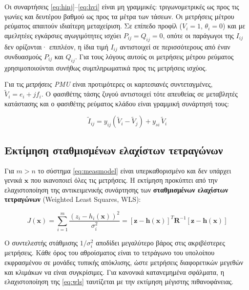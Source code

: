 Οι συναρτήσεις \eqref{eq:hinj}--\eqref{eq:hvi} είναι μη γραμμικές: τριγωνομετρικές ως προς τις
γωνίες και δευτέρου βαθμού ως προς τα μέτρα των τάσεων. Οι μετρήσεις μέτρου ρεύματος απαιτούν
ιδιαίτερη μεταχείριση. Σε επίπεδο προφίλ ($V_i = 1$, $\theta_i = 0$) και με αμελητέες
εγκάρσιες αγωγιμότητες ισχύει $P_{ij} = Q_{ij} = 0$, οπότε οι παράγωγοι της $I_{ij}$ δεν
ορίζονται· επιπλέον, η ίδια τιμή $I_{ij}$ αντιστοιχεί σε περισσότερους από έναν συνδυασμούς
$P_{ij}$ και $Q_{ij}$. Για τους λόγους αυτούς οι μετρήσεις μέτρου ρεύματος χρησιμοποιούνται
συνήθως συμπληρωματικά προς τις μετρήσεις ισχύος.

Για τις \emph{μετρήσεις PMU} είναι προτιμότερες οι καρτεσιανές συντεταγμένες,
$\tilde{V}_i = e_i + j f_i$. Ο φασιθέτης τάσης ζυγού αντιστοιχεί τότε απευθείας σε μεταβλητές
κατάστασης και ο φασιθέτης ρεύματος κλάδου είναι γραμμική συνάρτησή τους:

\begin{equation}
\tilde{I}_{ij} = y_{ij}\left(\tilde{V}_i - \tilde{V}_j\right) + y_{si}\,\tilde{V}_i
\label{eq:hpmu}
\end{equation}

\subsection{Εκτίμηση σταθμισμένων ελαχίστων τετραγώνων}
\label{sec:wls}

Για $m > n$ το σύστημα \eqref{eq:measmodel} είναι υπερκαθορισμένο και δεν υπάρχει γενικά
$\mathbf{x}$ που ικανοποιεί όλες τις μετρήσεις. Η εκτίμηση προκύπτει από την ελαχιστοποίηση της
αντικειμενικής συνάρτησης των \textbf{σταθμισμένων ελαχίστων τετραγώνων} (Weighted Least
Squares, WLS):

\begin{equation}
J(\mathbf{x}) = \sum_{i=1}^{m} \frac{\left(z_i - h_i(\mathbf{x})\right)^2}{\sigma_i^2}
             = \left[\mathbf{z}-\mathbf{h}(\mathbf{x})\right]^{T} \mathbf{R}^{-1}
               \left[\mathbf{z}-\mathbf{h}(\mathbf{x})\right]
\label{eq:wls}
\end{equation}

Ο συντελεστής στάθμισης $1/\sigma_i^2$ αποδίδει μεγαλύτερο βάρος στις ακριβέστερες μετρήσεις.
Κάθε όρος του αθροίσματος είναι το τετράγωνο του υπολοίπου εκφρασμένου σε μονάδες τυπικής
απόκλισης, ώστε μετρήσεις διαφορετικών μεγεθών και κλιμάκων να είναι συγκρίσιμες. Για
κανονικά κατανεμημένα σφάλματα, η ελαχιστοποίηση της \eqref{eq:wls} ταυτίζεται με την
εκτίμηση μέγιστης πιθανοφάνειας.

